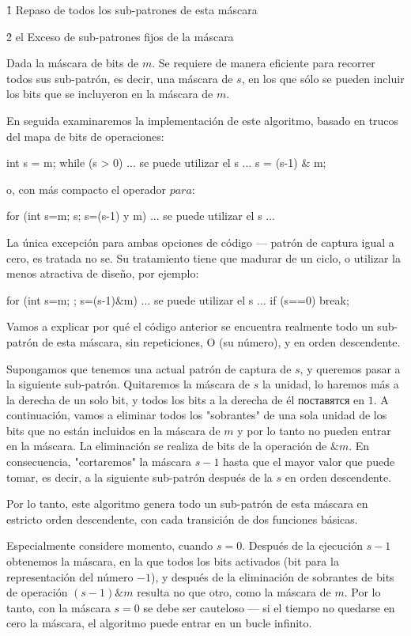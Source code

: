 \h1{ Repaso de todos los sub-patrones de esta máscara }


\h2{ el Exceso de sub-patrones fijos de la máscara }

Dada la máscara de bits de $m$. Se requiere de manera eficiente para recorrer todos sus sub-patrón, es decir, una máscara de $s$, en los que sólo se pueden incluir los bits que se incluyeron en la máscara de $m$.

En seguida examinaremos la implementación de este algoritmo, basado en trucos del mapa de bits de operaciones:

\code
int s = m;
while (s > 0) {
... se puede utilizar el s ...
s = (s-1) & m;
}
\endcode

o, con más compacto el operador $para$:

\code
for (int s=m; s; s=(s-1) y m)
... se puede utilizar el s ...
\endcode

La única excepción para ambas opciones de código --- patrón de captura igual a cero, es tratada no se. Su tratamiento tiene que madurar de un ciclo, o utilizar la menos atractiva de diseño, por ejemplo:

\code
for (int s=m; ; s=(s-1)&m) {
... se puede utilizar el s ...
if (s==0) break;
}
\endcode

Vamos a explicar por qué el código anterior se encuentra realmente todo un sub-patrón de esta máscara, sin repeticiones, O (su número), y en orden descendente.

Supongamos que tenemos una actual patrón de captura de $s$, y queremos pasar a la siguiente sub-patrón. Quitaremos la máscara de $s$ la unidad, lo haremos más a la derecha de un solo bit, y todos los bits a la derecha de él поставятся en $1$. A continuación, vamos a eliminar todos los "sobrantes" de una sola unidad de los bits que no están incluidos en la máscara de $m$ y por lo tanto no pueden entrar en la máscara. La eliminación se realiza de bits de la operación de $\& m$. En consecuencia, "cortaremos" la máscara $s-1$ hasta que el mayor valor que puede tomar, es decir, a la siguiente sub-patrón después de la $s$ en orden descendente.

Por lo tanto, este algoritmo genera todo un sub-patrón de esta máscara en estricto orden descendente, con cada transición de dos funciones básicas.

Especialmente considere momento, cuando $s = 0$. Después de la ejecución $s-1$ obtenemos la máscara, en la que todos los bits activados (bit para la representación del número $-1$), y después de la eliminación de sobrantes de bits de operación $(s-1) \& m$ resulta no que otro, como la máscara de $m$. Por lo tanto, con la máscara $s = 0$ se debe ser cauteloso --- si el tiempo no quedarse en cero la máscara, el algoritmo puede entrar en un bucle infinito.


